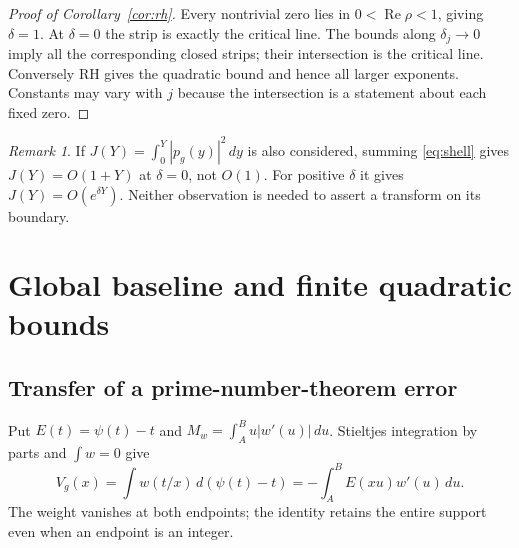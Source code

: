 \documentclass[11pt]{article}
\theoremstyle{remark}
\newtheorem{remark}[theorem]{Remark}
\newcommand{\dd}{\,d}
\newcommand{\Rea}{\operatorname{Re}}
\numberwithin{equation}{section}
\begin{document}
\begin{proof}[Proof of Corollary~\ref{cor:rh}]
Every nontrivial zero lies in $0<\Rea\rho<1$, giving $\delta=1$.
At $\delta=0$ the strip is exactly the critical line. The bounds along
$\delta_j\to0$ imply all the corresponding closed strips; their
intersection is the critical line. Conversely RH gives the quadratic
bound and hence all larger exponents. Constants may vary with $j$
because the intersection is a statement about each fixed zero.
\end{proof}

\begin{remark}
If $J(Y)=\int_0^Y|p_g(y)|^2\dd y$ is also considered, summing
\eqref{eq:shell} gives $J(Y)=O(1+Y)$ at $\delta=0$, not $O(1)$.
For positive $\delta$ it gives $J(Y)=O(e^{\delta Y})$.
Neither observation is needed to assert a transform on its boundary.
\end{remark}

\section{Global baseline and finite quadratic bounds}\label{sec:bounds}
\subsection{Transfer of a prime-number-theorem error}
Put $E(t)=\psi(t)-t$ and $M_w=\int_A^B u|w'(u)|\dd u$.
Stieltjes integration by parts and $\int w=0$ give
\begin{equation}\label{eq:pnt-transfer}
V_g(x)=\int w(t/x)\dd(\psi(t)-t)
=-\int_A^B E(xu)w'(u)\dd u.
\end{equation}
The weight vanishes at both endpoints; the identity retains the entire
support even when an endpoint is an integer.
\end{document}
